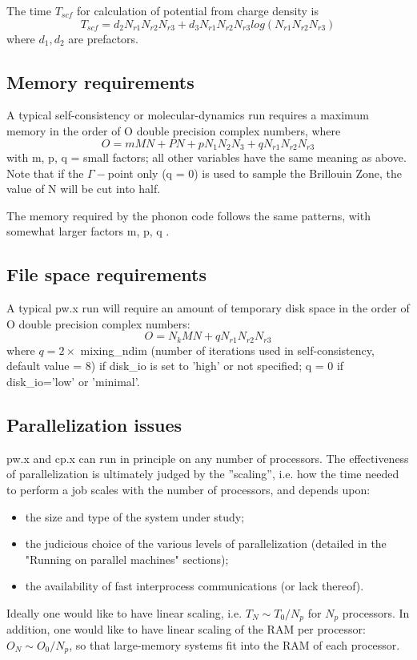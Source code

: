 \documentclass[12pt,a4paper]{article}
\begin{document}
The time $T_{scf}$ for calculation of potential from charge density is
$$T_{scf} = d_2 N_{r1} N_{r2} N_{r3} + d_3 N_{r1} N_{r2} N_{r3} 
            log(N_{r1} N_{r2} N_{r3} )$$
where $d_1, d_2$ are prefactors.

\subsection{Memory requirements}

A typical self-consistency or molecular-dynamics run requires a maximum
memory in the order of O double precision complex numbers, where
$$ O = m M N + P N + p N_1 N_2 N_3 + q N_{r1} N_{r2} N_{r3}$$
with m, p, q = small factors; all other variables have the same meaning as
above. Note that if the $\Gamma-$point only (q = 0) is used to sample the 
Brillouin Zone, the value of N will be cut into half.

The memory required by the phonon code follows the same patterns, with
somewhat larger factors m, p, q .

\subsection{File space requirements}

A typical pw.x run will require an amount of temporary disk space in the
order of O double precision complex numbers:
$$O = N_k M N + q N_{r1} N_{r2}N_{r3}$$
where $q = 2\times$ mixing\_ndim (number of iterations used in 
self-consistency, default value = 8) if disk\_io is set to 'high' 
or not specified; q = 0 if disk\_io='low' or 'minimal'.

\subsection{Parallelization issues}

pw.x and cp.x can run in principle on any number of processors.
The effectiveness of parallelization is ultimately judged by the 
''scaling'', i.e. how the time needed to perform a job scales
 with the number of processors, and depends upon:
\begin{itemize}
\item the size and type of the system under study;
\item the judicious choice of the various levels of parallelization 
(detailed in the "Running on parallel machines" sections);
\item the availability of fast interprocess communications (or lack thereof).
\end{itemize}
Ideally one would like to have linear scaling, i.e. $T_N \sim T_0/N_p$ for 
$N_p$ processors. In addition, one would like to have linear scaling of
the RAM per processor: $O_N \sim O_0/N_p$, so that large-memory systems
fit into the RAM of each processor.
\end{document}
